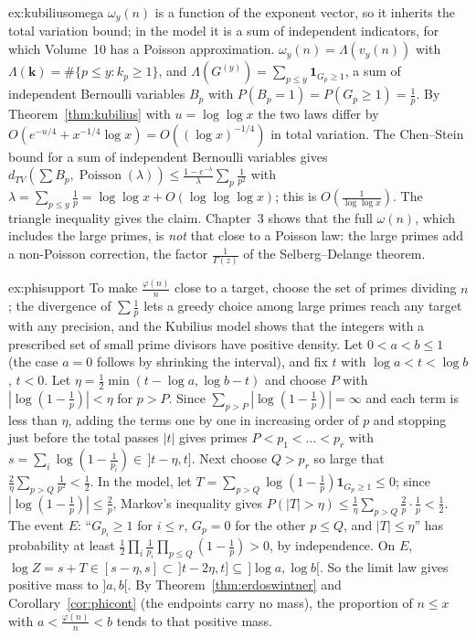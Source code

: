 \begin{solution}{ex:kubiliusomega}
\idea $\omega_y(n)$ is a function of the exponent vector, so it inherits the total variation bound; in the model it is a sum of independent indicators, for which Volume~10 has a Poisson approximation.
\writeup $\omega_y(n)=\Lambda(v_y(n))$ with $\Lambda(\mathbf k)=\#\{p\le y:k_p\ge1\}$, and $\Lambda(G^{(y)})=\sum_{p\le y}\mathbf 1_{G_p\ge1}$, a sum of independent Bernoulli variables $B_p$ with $P(B_p=1)=P(G_p\ge1)=\frac1p$. By Theorem~\ref{thm:kubilius} with $u=\log\log x$ the two laws differ by $O(e^{-u/4}+x^{-1/4}\log x)=O((\log x)^{-1/4})$ in total variation. The Chen--Stein bound for a sum of independent Bernoulli variables gives $d_{TV}(\sum B_p,\operatorname{Poisson}(\lambda))\le\frac{1-e^{-\lambda}}\lambda\sum_p\frac1{p^2}$ with $\lambda=\sum_{p\le y}\frac1p=\log\log x+O(\log\log\log x)$; this is $O(\frac1{\log\log x})$. The triangle inequality gives the claim. Chapter~3 shows that the full $\omega(n)$, which includes the large primes, is \emph{not} that close to a Poisson law: the large primes add a non-Poisson correction, the factor $\frac1{\Gamma(z)}$ of the Selberg--Delange theorem.
\end{solution}

\begin{solution}{ex:phisupport}
\idea To make $\frac{\varphi(n)}n$ close to a target, choose the set of primes dividing $n$; the divergence of $\sum\frac1p$ lets a greedy choice among large primes reach any target with any precision, and the Kubilius model shows that the integers with a prescribed set of small prime divisors have positive density.
\writeup Let $0<a<b\le1$ (the case $a=0$ follows by shrinking the interval), and fix $t$ with $\log a<t<\log b$, $t<0$. Let $\eta=\frac12\min(t-\log a,\log b-t)$ and choose $P$ with $|\log(1-\frac1p)|<\eta$ for $p>P$. Since $\sum_{p>P}|\log(1-\frac1p)|=\infty$ and each term is less than $\eta$, adding the terms one by one in increasing order of $p$ and stopping just before the total passes $|t|$ gives primes $P<p_1<\dots<p_r$ with $s=\sum_i\log(1-\frac1{p_i})\in\,]t-\eta,t]$. Next choose $Q>p_r$ so large that $\frac2\eta\sum_{p>Q}\frac1{p^2}<\frac12$. In the model, let $T=\sum_{p>Q}\log(1-\frac1p)\mathbf 1_{G_p\ge1}\le0$; since $|\log(1-\frac1p)|\le\frac2p$, Markov's inequality gives $P(|T|>\eta)\le\frac1\eta\sum_{p>Q}\frac2p\cdot\frac1p<\frac12$. The event $E$: ``$G_{p_i}\ge1$ for $i\le r$, $G_p=0$ for the other $p\le Q$, and $|T|\le\eta$'' has probability at least $\frac12\prod_i\frac1{p_i}\prod_{p\le Q}(1-\frac1p)>0$, by independence. On $E$, $\log Z=s+T\in[s-\eta,s]\subset\,]t-2\eta,t]\subseteq\,]\log a,\log b[$. So the limit law gives positive mass to $]a,b[$. By Theorem~\ref{thm:erdoswintner} and Corollary~\ref{cor:phicont} (the endpoints carry no mass), the proportion of $n\le x$ with $a<\frac{\varphi(n)}n<b$ tends to that positive mass.
\end{solution}

